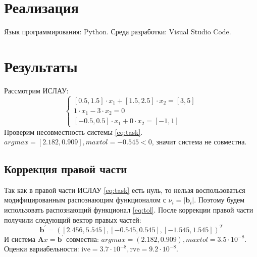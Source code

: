 \documentclass[a4paper,12pt]{article}
\begin{document}
    \section{Реализация}
    Язык программирования: Python. Среда разработки: Visual Studio Code.

    \section{Результаты}
    Рассмотрим ИСЛАУ:
    \begin{equation}
        \begin{cases}
            [0.5, 1.5] \cdot x_{1} + [1.5, 2.5] \cdot x_{2} = [3, 5] \\
            1 \cdot x_{1} - 3 \cdot x_{2} = 0 \\
            [-0.5, 0.5] \cdot x_{1} + 0 \cdot x_{2} = [-1, 1]
        \end{cases}
        \label{eq:task}
    \end{equation}
    \noindent
    Проверим несовместность системы \ref{eq:task}. $ argmax = [2.182, 0.909], maxtol = -0.545 < 0 $, значит система не совместна.
    
    \subsection{Коррекция правой части}
    Так как в правой части ИСЛАУ \ref{eq:task} есть нуль, то нельзя воспользоваться модифицированным распознающим функционалом с $ \nu_{i} = | \textbf{b}_{i} | $.
    Поэтому будем использовать распознающий функционал \ref{eq:tol}. \newline
    После коррекции правой части получили следующий вектор правых частей:
    \begin{equation}
        \textbf{b}^{'} = ([2.456, 5.545], [-0.545, 0.545], [-1.545, 1.545])^{T}
        \label{eq:newb}
    \end{equation}
    И система $ \textbf{A}x = \textbf{b}^{'} $ совместна: $ argmax = (2.182, 0.909), maxtol = 3.5 \cdot 10^{-8} $. \newline
    Оценки вариабельности: \newline
    $ \text{ive} = 3.7 \cdot 10^{-8}, \text{rve} = 9.2 \cdot 10^{-8} $.
\end{document}
